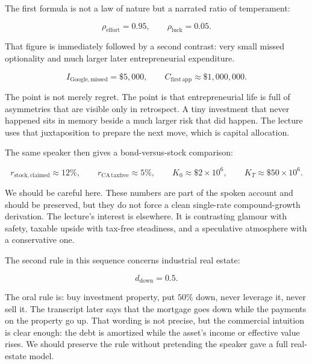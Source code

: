 The first formula is not a law of nature but a narrated ratio of temperament:

\begin{equation}
\rho_{\mathrm{effort}} = 0.95,
\qquad
\rho_{\mathrm{luck}} = 0.05.
\end{equation}

That figure is immediately followed by a second contrast: very small missed optionality and much larger later entrepreneurial expenditure.

\begin{equation}
I_{\mathrm{Google,missed}} = \$5{,}000,
\qquad
C_{\mathrm{first\,app}} \approx \$1{,}000{,}000.
\end{equation}

The point is not merely regret. The point is that entrepreneurial life is full of asymmetries that are visible only in retrospect. A tiny investment that never happened sits in memory beside a much larger risk that did happen. The lecture uses that juxtaposition to prepare the next move, which is capital allocation.

The same speaker then gives a bond-versus-stock comparison:

\begin{equation}
r_{\mathrm{stock,claimed}} \approx 12\%,
\qquad
r_{\mathrm{CA\,taxfree}} \approx 5\%,
\qquad
K_0 \approx \$2\times 10^6,
\qquad
K_T \approx \$50\times 10^6.
\end{equation}

We should be careful here. These numbers are part of the spoken account and should be preserved, but they do not force a clean single-rate compound-growth derivation. The lecture's interest is elsewhere. It is contrasting glamour with safety, taxable upside with tax-free steadiness, and a speculative atmosphere with a conservative one.

The second rule in this sequence concerns industrial real estate:

\begin{equation}
d_{\mathrm{down}} = 0.5.
\end{equation}

The oral rule is: buy investment property, put \(50\%\) down, never leverage it, never sell it. The transcript later says that the mortgage goes down while the payments on the property go up. That wording is not precise, but the commercial intuition is clear enough: the debt is amortized while the asset's income or effective value rises. We should preserve the rule without pretending the speaker gave a full real-estate model.

